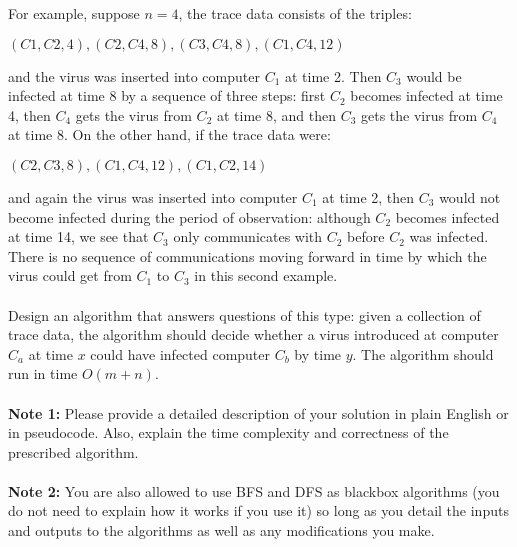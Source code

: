 \documentclass[11pt]{article}
\begin{document}
For example, suppose $n= 4$, the trace data consists of the triples:
\begin{center}
$(C1, C2,4), (C2,C4,8), (C3,C4,8), (C1,C4, 12)$

\end{center}
and the virus was inserted into computer $C_1$ at time 2. Then $C_3$ would be infected at time 8 by a sequence of three steps: first $C_2$ becomes infected at time 4, then $C_4$ gets the virus from $C_2$ at time 8, and then $C_3$ gets the virus from $C_4$ at time 8. On the other hand, if the trace data were:
\begin{center}
$(C2, C3, 8), (C1,C4, 12), (C1, C2, 14)$
\end{center}
and again the virus was inserted into computer $C_1$ at time 2, then $C_3$ would not become infected during the period of observation: although $C_2$ becomes infected at time 14, we see that $C_3$ only communicates with $C_2$ before $C_2$ was infected. There is no sequence of communications moving forward in time by which the virus could get from $C_1$ to $C_3$ in this second example. \\ \\ \noindent
Design an algorithm that answers questions of this type: given a collection of trace data, the algorithm should decide whether a virus introduced at computer $C_a$ at time $x$ could have infected computer $C_b$ by time $y$. The algorithm should run in time $O(m+n)$.
\\ \\
\noindent
\textbf{Note 1:} Please provide a detailed description of your solution in plain English or in pseudocode. Also, explain the time complexity and correctness of the prescribed algorithm.\\ \\
\textbf{Note 2:} You are also allowed to use BFS and DFS as blackbox algorithms (you do not need to explain how it works if you use it) so long as you detail the inputs and outputs to the algorithms as well as any modifications you make.​
\end{document}
